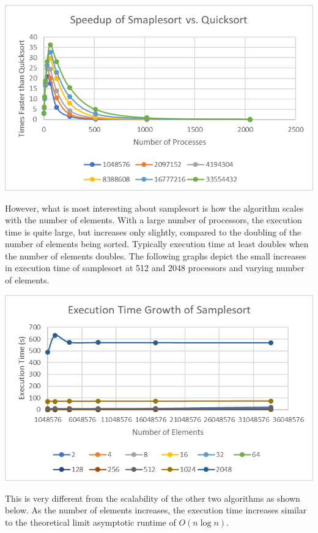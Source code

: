 \documentclass[10pt,letterpaper]{article}
\begin{document}
\begin{multicols}{2}
\begin{center}
\includegraphics[scale=1.3]{sample_speedup}
\end{center}

However, what is most interesting about samplesort is how the algorithm scales with the number of elements. With a large number of processors, the execution time is quite large, but increases only slightly, compared to the doubling of the number of elements being sorted. Typically execution time at least doubles when the number of elements doubles. The following graphs depict the small increases in execution time of samplesort at 512 and 2048 processors and varying number of elements.

\begin{center}
\includegraphics[scale=1.3]{sample_growth}
\end{center}

This is very different from the scalability of the other two algorithms as shown below. As the number of elements increases, the execution time increases similar to the theoretical limit asymptotic runtime of $O(n \log n)$.


\end{multicols}
\end{document}
